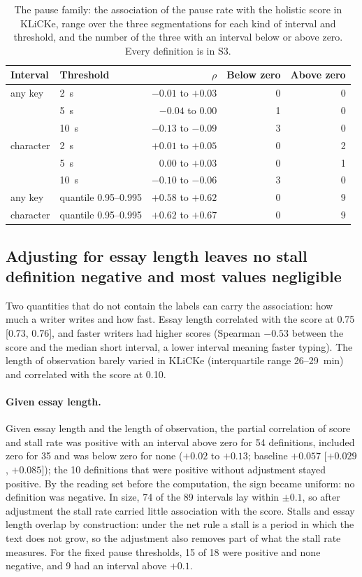 \begin{table}[t]
\centering\footnotesize
\caption{The pause family: the association of the pause rate with the holistic score in KLiCKe, range over the three
segmentations for each kind of interval and threshold, and the number of the three with an interval below or above
zero. Every definition is in S3.}
\label{tab:pause}
\begin{tabular}{@{}l l r r r@{}}
\toprule
Interval & Threshold & $\rho$ & Below zero & Above zero \\
\midrule
any key & 2~s & $-0.01$ to $+0.03$ & 0 & 0 \\
 & 5~s & $-0.04$ to $0.00$ & 1 & 0 \\
 & 10~s & $-0.13$ to $-0.09$ & 3 & 0 \\
character & 2~s & $+0.01$ to $+0.05$ & 0 & 2 \\
 & 5~s & $0.00$ to $+0.03$ & 0 & 1 \\
 & 10~s & $-0.10$ to $-0.06$ & 3 & 0 \\
any key & quantile 0.95--0.995 & $+0.58$ to $+0.62$ & 0 & 9 \\
character & quantile 0.95--0.995 & $+0.62$ to $+0.67$ & 0 & 9 \\
\bottomrule
\end{tabular}
\end{table}

\subsection{Adjusting for essay length leaves no stall definition negative and most values negligible}
\label{sec:res-adjust}

Two quantities that do not contain the labels can carry the association: how much a writer writes and how fast.
Essay length correlated with the score at 0.75 [0.73, 0.76], and faster writers had higher scores (Spearman $-0.53$
between the score and the median short interval, a lower interval meaning faster typing). The length of observation
barely varied in KLiCKe (interquartile range 26--29~min) and correlated with the score at 0.10.

\paragraph{Given essay length.} Given essay length and the length of observation, the partial correlation of score and
stall rate was positive with an interval above zero for 54 definitions, included zero for 35 and was below zero for
none ($+0.02$ to $+0.13$; baseline $+0.057$ [$+0.029$, $+0.085$]); the 10 definitions that were positive without
adjustment stayed positive. By the reading set before the computation, the sign became uniform: no definition was
negative. In size, 74 of the 89 intervals lay within $\pm 0.1$, so after adjustment the stall rate carried little
association with the score. Stalls and essay length overlap by construction: under the net rule a stall is a period in
which the text does not grow, so the adjustment also removes part of what the stall rate measures. For the fixed pause
thresholds, 15 of 18 were positive and none negative, and 9 had an interval above $+0.1$.

